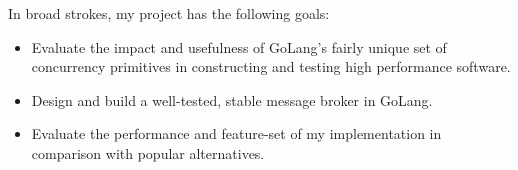 In broad strokes, my project has the following goals:

 \begin{itemize}
   \item Evaluate the impact and usefulness of GoLang's fairly unique set of
   concurrency primitives in constructing and testing high performance software.
   \item Design and build a well-tested, stable message broker in GoLang.
   \item Evaluate the performance and feature-set of my implementation in
   comparison with popular alternatives.
 \end{itemize}
